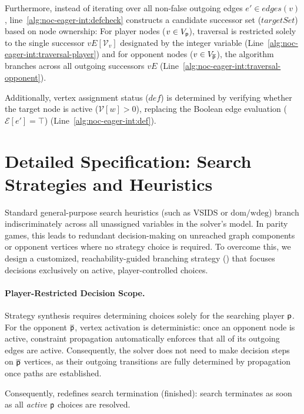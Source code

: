 \documentclass{article}
\begin{document}
\begin{appendices}
Furthermore, instead of iterating over all non-false outgoing edges $e' \in \textit{edges}(v)$, line~\ref{alg:noc-eager-int:defcheck} constructs a candidate successor set ($\textit{targetSet}$) based on node ownership:
For player nodes ($v \in V_{\mathsf{p}}$), traversal is restricted solely to the single successor $vE[\mathcal{V}_v]$ designated by the integer variable (Line~\ref{alg:noc-eager-int:traversal-player}) and for opponent nodes ($v \in V_{\overline{\mathsf{p}}}$), the algorithm branches across all outgoing successors $vE$ (Line~\ref{alg:noc-eager-int:traversal-opponent}).

Additionally, vertex assignment status ($\textit{def}$) is determined by verifying whether the target node is active ($\mathcal{V}[w] > 0$), replacing the Boolean edge evaluation ($\mathcal{E}[e'] = \top$) (Line~\ref{alg:noc-eager-int:def}).

\section{Detailed Specification: Search Strategies and Heuristics}\label{apx:heuristics}

Standard general-purpose search heuristics (such as VSIDS or $\text{dom}/\text{wdeg}$) branch indiscriminately across all unassigned variables in the solver's model. In parity games, this leads to redundant decision-making on unreached graph components or opponent vertices where no strategy choice is required. To overcome this, we design a customized, reachability-guided branching strategy (\nocbrancher) that focuses decisions exclusively on active, player-controlled choices.

\paragraph{Player-Restricted Decision Scope.}

Strategy synthesis requires determining choices solely for the searching player $\mathsf{p}$. For the opponent $\overline{\mathsf{p}}$, vertex activation is deterministic: once an opponent node is active, constraint propagation automatically enforces that all of its outgoing edges are active. Consequently, the solver does not need to make decision steps on $\overline{\mathsf{p}}$ vertices, as their outgoing transitions are fully determined by propagation once paths are established.

Consequently, \nocbrancher redefines search termination (\textsf{finished}): search terminates as soon as all \emph{active} $\mathsf{p}$ choices are resolved.


\end{appendices}
\end{document}
